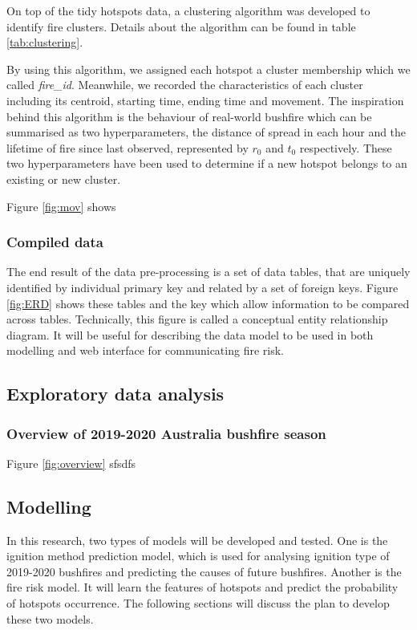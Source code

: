 \documentclass[11pt,a4paper,]{article}
\begin{document}
On top of the tidy hotspots data, a clustering algorithm was developed
to identify fire clusters. Details about the algorithm can be found in
table \ref{tab:clustering}.

By using this algorithm, we assigned each hotspot a cluster membership
which we called \emph{fire\_id}. Meanwhile, we recorded the
characteristics of each cluster including its centroid, starting time,
ending time and movement. The inspiration behind this algorithm is the
behaviour of real-world bushfire which can be summarised as two
hyperparameters, the distance of spread in each hour and the lifetime of
fire since last observed, represented by \(r_0\) and \(t_0\)
respectively. These two hyperparameters have been used to determine if a
new hotspot belongs to an existing or new cluster.

Figure \ref{fig:mov} shows

\subsubsection{Compiled data}\label{compiled-data}

The end result of the data pre-processing is a set of data tables, that
are uniquely identified by individual primary key and related by a set
of foreign keys. Figure \ref{fig:ERD} shows these tables and the key
which allow information to be compared across tables. Technically, this
figure is called a conceptual entity relationship diagram. It will be
useful for describing the data model to be used in both modelling and
web interface for communicating fire risk.

\subsection{Exploratory data analysis}\label{exploratory-data-analysis}

\subsubsection{Overview of 2019-2020 Australia bushfire
season}\label{overview-of-2019-2020-australia-bushfire-season}

Figure \ref{fig:overview} sfsdfs

\subsection{Modelling}\label{modelling}

In this research, two types of models will be developed and tested. One
is the ignition method prediction model, which is used for analysing
ignition type of 2019-2020 bushfires and predicting the causes of future
bushfires. Another is the fire risk model. It will learn the features of
hotspots and predict the probability of hotspots occurrence. The
following sections will discuss the plan to develop these two models.
\end{document}
